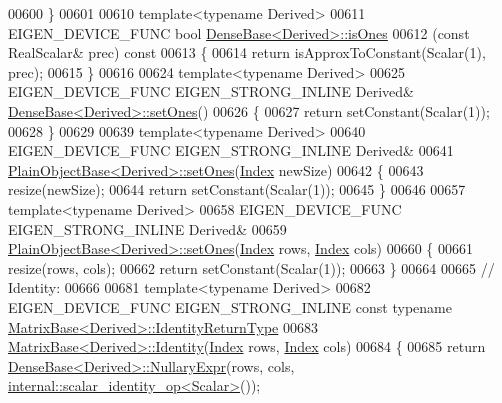 \begin{DoxyCode}
00600 \}
00601 
00610 \textcolor{keyword}{template}<\textcolor{keyword}{typename} Derived>
00611 EIGEN\_DEVICE\_FUNC \textcolor{keywordtype}{bool} \hyperlink{group___core___module_a91fb1c80e1fd4970a16fd509764225d7}{DenseBase<Derived>::isOnes}
00612 (\textcolor{keyword}{const} RealScalar& prec)\textcolor{keyword}{ const}
00613 \textcolor{keyword}{}\{
00614   \textcolor{keywordflow}{return} isApproxToConstant(Scalar(1), prec);
00615 \}
00616 
00624 \textcolor{keyword}{template}<\textcolor{keyword}{typename} Derived>
00625 EIGEN\_DEVICE\_FUNC EIGEN\_STRONG\_INLINE Derived& \hyperlink{group___core___module_ad18970fd7d9f9c3d8db9d05fa8652a25}{DenseBase<Derived>::setOnes}()
00626 \{
00627   \textcolor{keywordflow}{return} setConstant(Scalar(1));
00628 \}
00629 
00639 \textcolor{keyword}{template}<\textcolor{keyword}{typename} Derived>
00640 EIGEN\_DEVICE\_FUNC EIGEN\_STRONG\_INLINE Derived&
00641 \hyperlink{class_eigen_1_1_plain_object_base_a2871e88e1feb1cc665fa1f1cc800078b}{PlainObjectBase<Derived>::setOnes}(\hyperlink{namespace_eigen_a62e77e0933482dafde8fe197d9a2cfde}{Index} newSize)
00642 \{
00643   resize(newSize);
00644   \textcolor{keywordflow}{return} setConstant(Scalar(1));
00645 \}
00646 
00657 \textcolor{keyword}{template}<\textcolor{keyword}{typename} Derived>
00658 EIGEN\_DEVICE\_FUNC EIGEN\_STRONG\_INLINE Derived&
00659 \hyperlink{class_eigen_1_1_plain_object_base_a2871e88e1feb1cc665fa1f1cc800078b}{PlainObjectBase<Derived>::setOnes}(\hyperlink{namespace_eigen_a62e77e0933482dafde8fe197d9a2cfde}{Index} rows, 
      \hyperlink{namespace_eigen_a62e77e0933482dafde8fe197d9a2cfde}{Index} cols)
00660 \{
00661   resize(rows, cols);
00662   \textcolor{keywordflow}{return} setConstant(Scalar(1));
00663 \}
00664 
00665 \textcolor{comment}{// Identity:}
00666 
00681 \textcolor{keyword}{template}<\textcolor{keyword}{typename} Derived>
00682 EIGEN\_DEVICE\_FUNC EIGEN\_STRONG\_INLINE \textcolor{keyword}{const} \textcolor{keyword}{typename} 
      \hyperlink{group___core___module_class_eigen_1_1_cwise_nullary_op}{MatrixBase<Derived>::IdentityReturnType}
00683 \hyperlink{group___core___module_a2ef43190f3aba0aef0cf1030d46d0ca7}{MatrixBase<Derived>::Identity}(\hyperlink{namespace_eigen_a62e77e0933482dafde8fe197d9a2cfde}{Index} rows, 
      \hyperlink{namespace_eigen_a62e77e0933482dafde8fe197d9a2cfde}{Index} cols)
00684 \{
00685   \textcolor{keywordflow}{return} \hyperlink{group___core___module_class_eigen_1_1_dense_base}{DenseBase<Derived>::NullaryExpr}(rows, cols, 
      \hyperlink{struct_eigen_1_1internal_1_1scalar__identity__op}{internal::scalar\_identity\_op<Scalar>}());

\end{DoxyCode}
